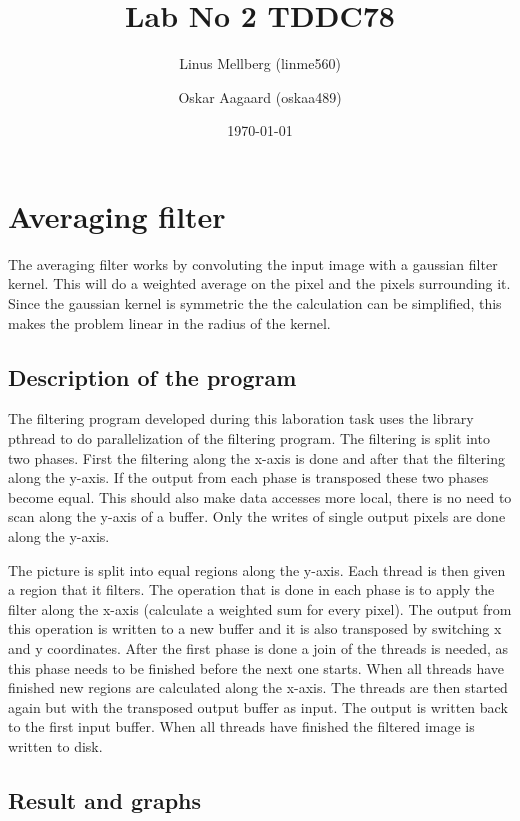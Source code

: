 \documentclass[a4paper,11pt]{article}
\begin{document}
\title{Lab No 2 TDDC78}
\author{Linus Mellberg (linme560) \and Oskar Aagaard (oskaa489)}
\date{\today}
\maketitle
\pagebreak
\thispagestyle{tcr}
\pagestyle{tcr}

\section{Averaging filter}
The averaging filter works by convoluting the input image with a gaussian filter kernel.
This will do a weighted average on the pixel and the pixels surrounding it.
Since the gaussian kernel is symmetric the the calculation can be simplified, this makes the problem linear in the radius of the kernel.
\subsection{Description of the program}
The filtering program developed during this laboration task uses the library pthread to do parallelization of the filtering program.
The filtering is split into two phases.
First the filtering along the x-axis is done and after that the filtering along the y-axis.
If the output from each phase is transposed these two phases become equal.
This should also make data accesses more local, there is no need to scan along the y-axis of a buffer.
Only the writes of single output pixels are done along the y-axis.

The picture is split into equal regions along the y-axis.
Each thread is then given a region that it filters.
The operation that is done in each phase is to apply the filter along the x-axis (calculate a weighted sum for every pixel).
The output from this operation is written to a new buffer and it is also transposed by switching x and y coordinates.
After the first phase is done a join of the threads is needed, as this phase needs to be finished before the next one starts.
When all threads have finished new regions are calculated along the x-axis.
The threads are then started again but with the transposed output buffer as input.
The output is written back to the first input buffer.
When all threads have finished the filtered image is written to disk.

\subsection{Result and graphs}
\end{document}

